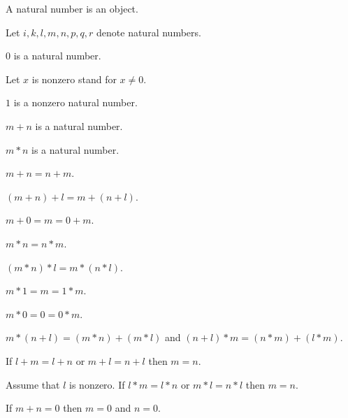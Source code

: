 \documentclass[11pt]{article}
\begin{document}
\begin{forthel}

\begin{signature}
  A natural number is an object.
\end{signature}

Let $i,k,l,m,n,p,q,r$ denote natural numbers.

\begin{signature} $0$ is a natural number.
\end{signature}

Let $x$ is nonzero stand for $x \neq 0$.

\begin{signature} $1$ is a nonzero natural number.
\end{signature}

\begin{signature} $m + n$ is a natural number.
\end{signature}

\begin{signature} $m * n$ is a natural number.
\end{signature}

\begin{axiom} $m + n = n + m$.
\end{axiom}

\begin{axiom} $(m + n) + l = m + (n + l)$.
\end{axiom}

\begin{axiom}  $m + 0 = m = 0 + m$.
\end{axiom}

\begin{axiom} $m * n = n * m$.
\end{axiom}

\begin{axiom} $(m * n) * l = m * (n * l)$.
\end{axiom}

\begin{axiom} $m * 1 = m = 1 * m$.
\end{axiom}

\begin{axiom} $m * 0 = 0 = 0 * m$.
\end{axiom}

\begin{axiom} $m * (n + l) = (m * n) + (m * l)$ and
                $(n + l) * m = (n * m) + (l * m)$.
\end{axiom}

\begin{axiom} If $l + m = l + n$ or $m + l = n + l$ 
then $m = n$.
\end{axiom}

\begin{axiom} Assume that $l$ is nonzero.
If $l * m = l * n$ or $m * l = n * l$ then $m = n$.
\end{axiom}

\begin{axiom} If $m + n = 0$ then $m = 0$ and $n = 0$.
\end{axiom}

\end{forthel}
\end{document}
